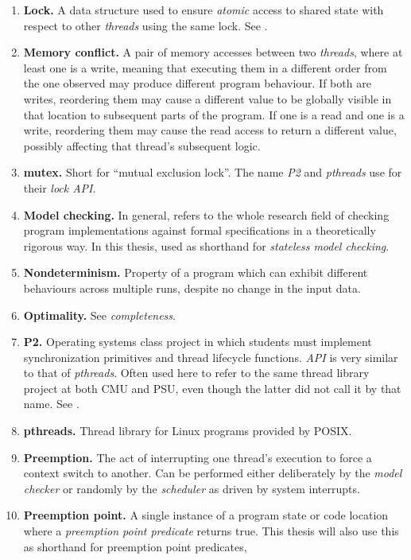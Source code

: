 \begin{enumerate}
	\item {\bf Lock.}
		A data structure used to ensure {\em atomic} access to shared state
		with respect to other {\em threads} using the same lock.
		See \sect{\ref{sec:overview-mutex}}.
	\item {\bf Memory conflict.}
		A pair of memory accesses between two {\em threads}, where at least one is a write,
		meaning that executing them in a different order from the one observed may produce different program behaviour.
		If both are writes, reordering them may cause a different value to be globally visible in that location
		to subsequent parts of the program.
		If one is a read and one is a write, reordering them may cause the read access to return a different value,
		possibly affecting that thread's subsequent logic.
	\item {\bf mutex.}
		Short for ``mutual exclusion lock''. The name {\em P2} and {\em pthreads} use for their {\em lock API}.
	\item {\bf Model checking.}
		In general, refers to the whole research field of checking program implementations against
		formal specifications in a theoretically rigorous way.
		In this thesis, used as shorthand for {\em stateless model checking}.
	\item {\bf Nondeterminism.}
		Property of a program which can exhibit different behaviours across multiple runs,
		despite no change in the input data.
	\item {\bf Optimality.} See {\em completeness}.
	\item {\bf P2.}
		Operating systems class project in which students must implement synchronization primitives
		and thread lifecycle functions.
		{\em API} is very similar to that of {\em pthreads}.
		Often used here to refer to the same thread library project at both CMU and PSU,
		even though the latter did not call it by that name.
		See \sect{\ref{sec:pebbles}}.
	\item {\bf pthreads.}
		Thread library for Linux programs provided by POSIX.
	\item {\bf Preemption.}
		The act of interrupting one thread's execution to force a context switch to another.
		Can be performed either deliberately by the {\em model checker}
		or randomly by the {\em scheduler} as driven by system interrupts.
	\item {\bf Preemption point.}
		A single instance of a program state or code location where a {\em preemption point predicate} returns true.
		This thesis will also use this as shorthand for preemption point predicates,

\end{enumerate}
